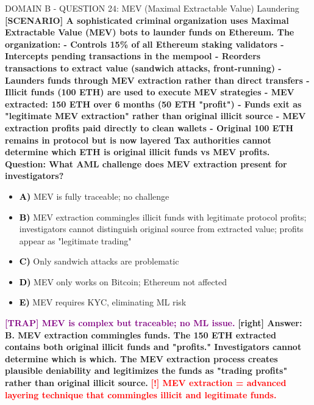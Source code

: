 \documentclass[11pt,a4paper]{beamer}
\newcommand{\redflag}[1]{\textcolor{red}{\textbf{[!] #1}}}
\newcommand{\trap}[1]{\textcolor{purple}{\textbf{[TRAP] #1}}}
\newcommand{\correct}[1]{\textcolor{green!50!black}{\textbf{[right] #1}}}
\newcommand{\scenario}[1]{\textcolor{blue!70!black}{\textbf{[SCENARIO] #1}}}
\newcommand{\option}[1]{\textcolor{black}{\textbf{#1}}}
\begin{document}
\begin{frame}{DOMAIN B - QUESTION 24: MEV (Maximal Extractable Value) Laundering}
\scenario{A sophisticated criminal organization uses Maximal Extractable Value (MEV) bots to launder funds on Ethereum. The organization:
- Controls 15\% of all Ethereum staking validators
- Intercepts pending transactions in the mempool
- Reorders transactions to extract value (sandwich attacks, front-running)
- Launders funds through MEV extraction rather than direct transfers
- Illicit funds (100 ETH) are used to execute MEV strategies
- MEV extracted: 150 ETH over 6 months (50 ETH "profit")
- Funds exit as "legitimate MEV extraction" rather than original illicit source
- MEV extraction profits paid directly to clean wallets
- Original 100 ETH remains in protocol but is now layered
Tax authorities cannot determine which ETH is original illicit funds vs MEV profits.}
\vspace{0.2cm}
\textbf{Question: What AML challenge does MEV extraction present for investigators?}
\vspace{0.1cm}
\begin{itemize}
    \item \option{A)} MEV is fully traceable; no challenge
    \item \option{B)} MEV extraction commingles illicit funds with legitimate protocol profits; investigators cannot distinguish original source from extracted value; profits appear as "legitimate trading"
    \item \option{C)} Only sandwich attacks are problematic
    \item \option{D)} MEV only works on Bitcoin; Ethereum not affected
    \item \option{E)} MEV requires KYC, eliminating ML risk
\end{itemize}
\vspace{0.2cm}
\trap{MEV is complex but traceable; no ML issue.}
\correct{Answer: B. MEV extraction commingles funds. The 150 ETH extracted contains both original illicit funds and "profits." Investigators cannot determine which is which. The MEV extraction process creates plausible deniability and legitimizes the funds as "trading profits" rather than original illicit source.}
\redflag{MEV extraction = advanced layering technique that commingles illicit and legitimate funds.}
\end{frame}

\end{document}
